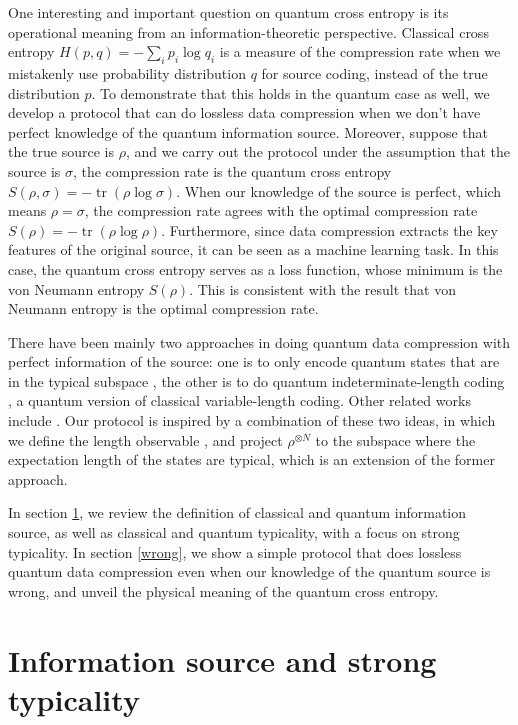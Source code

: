 \documentclass[11pt]{article}
\DeclareMathOperator{\tr}{\text{tr}}
\begin{document}
One interesting and important question on quantum cross entropy is its operational meaning from an information-theoretic perspective. Classical cross entropy $H(p,q) = -\sum_i p_i \log q_i$ is a measure of the compression rate when we mistakenly use probability distribution $q$ for source coding, instead of the true distribution $p$. To demonstrate that this holds in the quantum case as well, we develop a protocol that can do lossless data compression when we don't have perfect knowledge of the quantum information source. Moreover, suppose that the true source is $\rho$, and we carry out the protocol under the assumption that the source is $\sigma$, the compression rate is the quantum cross entropy $S(\rho, \sigma) = -\tr(\rho \log \sigma)$. When our knowledge of the source is perfect, which means $\rho = \sigma$, the compression rate agrees with the optimal compression rate $S(\rho) = -\tr(\rho \log \rho)$. Furthermore, since data compression extracts the key features of the original source, it can be seen as a machine learning task. In this case, the quantum cross entropy serves as a loss function, whose minimum is the von Neumann entropy $S(\rho)$. This is consistent with the result that von Neumann entropy is the optimal compression rate.

There have been mainly two approaches in doing quantum data compression with perfect information of the source: one is to only encode quantum states that are in the typical subspace \cite{qcoding, NielsenChuang}, the other is to do quantum indeterminate-length coding \cite{indeter}, a quantum version of classical variable-length coding. Other related works include \cite{universal, stationary, universal06}.
Our protocol is inspired by a combination of these two ideas, in which we define the length observable \cite{indeter}, and project $\rho^{\otimes N}$ to the subspace where the expectation length of the states are typical, which is an extension of the former approach.


In section \ref{strong}, we review the definition of classical and quantum information source, as well as classical and quantum typicality, with a focus on strong typicality. In section \ref{wrong}, we show a simple protocol that does lossless quantum data compression even when our knowledge of the quantum source is wrong, and unveil the physical meaning of the quantum cross entropy. 






\section{Information source and strong typicality}
\label{strong}
\end{document}
